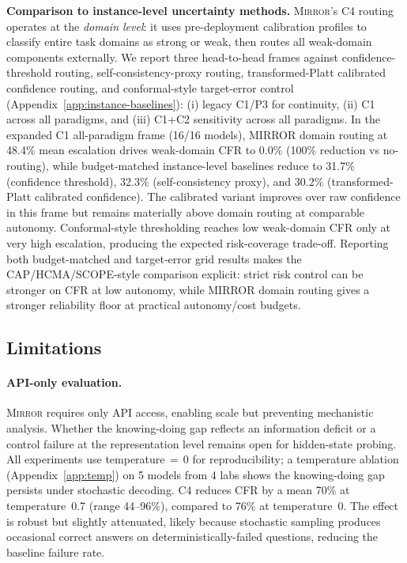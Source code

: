 \documentclass[10pt]{article}
\newcommand{\mirror}{\textsc{Mirror}}
\begin{document}
\textbf{Comparison to instance-level uncertainty methods.} \mirror{}'s C4 routing operates at the \textit{domain level}: it uses pre-deployment calibration profiles to classify entire task domains as strong or weak, then routes all weak-domain components externally. We report three head-to-head frames against confidence-threshold routing, self-consistency-proxy routing, transformed-Platt calibrated confidence routing, and conformal-style target-error control (Appendix~\ref{app:instance-baselines}): (i) legacy C1/P3 for continuity, (ii) C1 across all paradigms, and (iii) C1+C2 sensitivity across all paradigms. In the expanded C1 all-paradigm frame (16/16 models), MIRROR domain routing at 48.4\% mean escalation drives weak-domain CFR to 0.0\% (100\% reduction vs no-routing), while budget-matched instance-level baselines reduce to 31.7\% (confidence threshold), 32.3\% (self-consistency proxy), and 30.2\% (transformed-Platt calibrated confidence). The calibrated variant improves over raw confidence in this frame but remains materially above domain routing at comparable autonomy. Conformal-style thresholding reaches low weak-domain CFR only at very high escalation, producing the expected risk-coverage trade-off. Reporting both budget-matched and target-error grid results makes the CAP/HCMA/SCOPE-style comparison explicit: strict risk control can be stronger on CFR at low autonomy, while MIRROR domain routing gives a stronger reliability floor at practical autonomy/cost budgets.

\subsection{Limitations}

\paragraph{API-only evaluation.}
\mirror{} requires only API access, enabling scale but preventing mechanistic
analysis. Whether the knowing-doing gap reflects an information deficit or a
control failure at the representation level remains open for hidden-state probing.
All experiments use temperature$\,=\,0$ for reproducibility; a temperature ablation (Appendix~\ref{app:temp}) on 5 models from 4 labs shows the knowing-doing gap persists under stochastic decoding. C4 reduces CFR by a mean 70\% at temperature~0.7 (range 44--96\%), compared to 76\% at temperature~0. The effect is robust but slightly attenuated, likely because stochastic sampling produces occasional correct answers on deterministically-failed questions, reducing the baseline failure rate.
\end{document}
